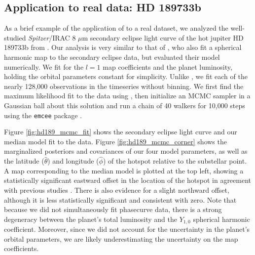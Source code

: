 \documentclass[modern]{aastex61}
\begin{document}
\pagebreak

\subsection{Application to real data: HD 189733b}
\label{sec:hd189}

As a brief example of the application of \starry to a real dataset, we analyzed the
well-studied \textit{Spitzer}/IRAC 8 $\mu$m secondary eclipse light curve of the
hot jupiter HD 189733b from \citet{Knutson2007}.
Our analysis is very similar to that of \citet{Majeau2012}, who also fit a spherical
harmonic map to the secondary eclipse data, but evaluated their model numerically.
We fit for the $l = 1$ map coefficients
and the planet luminosity, holding the orbital parameters constant for simplicity.
Unlike \citet{Majeau2012}, we fit each of the nearly 128,000 observations in the
timeseries without binning. We first find the maximum likelihood fit to the
data using \starrygrad, then initialize an MCMC sampler in a
Gaussian ball about this solution and run a chain of 40 walkers for 10,000 steps
using the \texttt{emcee} package \citep{Foreman-Mackey2013}.

Figure \ref{fig:hd189_mcmc_fit} shows the secondary eclipse light curve and our
median model fit to the data. Figure \ref{fig:hd189_mcmc_corner}
shows the marginalized posteriors and covariances of our four model parameters, as
well as the latitude ($\hat{\theta}$) and longitude ($\hat{\phi}$) of the hotspot
relative to the substellar
point. A map corresponding to the median model is plotted at the top left,
showing a statistically significant eastward
offset in the location of the hotspot in agreement with previous studies
\citep{Knutson2007, Majeau2012}. There is also evidence for a slight northward offset,
although it is less statistically significant and consistent with zero.
Note that because we did not simultaneously
fit phasecurve data, there is a strong degeneracy between the planet's
total luminosity and the $Y_{1,0}$ spherical harmonic coefficient. Moreover,
since we did not account for the uncertainty in the planet's orbital parameters,
we are likely underestimating the uncertainty on the map coefficients.
\end{document}
